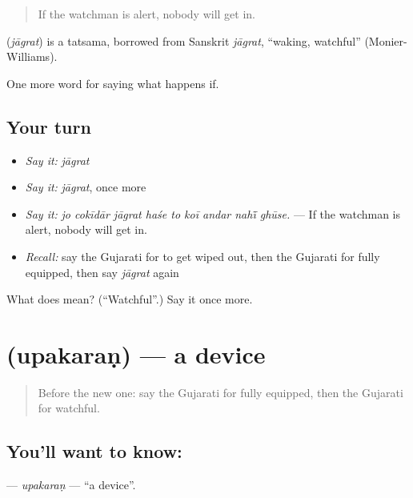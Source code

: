 \begin{quote}
If the watchman is alert, nobody will get in.
\end{quote}

\begin{cousinweb}
\textbf{} (\emph{jāgrat}) is a tatsama, borrowed from Sanskrit \emph{jāgrat}, \textquotedblleft{}waking, watchful\textquotedblright{} (Monier-Williams).
\end{cousinweb}

\begin{grammarlens}[title={What you've built}]
One more word for saying what happens if.
\end{grammarlens}

\subsection*{Your turn}
\begin{itemize}
\raggedright
  \item \emph{Say it:} \emph{jāgrat}
  \item \emph{Say it:} \emph{jāgrat}, once more
  \item \emph{Say it:} \emph{jo cokīdār jāgrat haśe to koī andar nahī̃ ghūse.} — If the watchman is alert, nobody will get in.
  \item \emph{Recall:} say the Gujarati for to get wiped out, then the Gujarati for fully equipped, then say \emph{jāgrat} again
\end{itemize}

\begin{tcolorbox}[breakable,colback=teal!4,colframe=teal!35!black,title={Before you move on}]
What does  mean? (\textquotedblleft{}Watchful\textquotedblright{}.) Say it once more.
\end{tcolorbox}
\section[\texorpdfstring{\gu{ઉપકરણ} (upakaraṇ)}{ઉપકરણ (upakaraṇ)}]{ (upakaraṇ) — a device}

\label{lesson:GU-C392-upakaran}



\begin{quote}
Before the new one: say the Gujarati for fully equipped, then the Gujarati for watchful.
\end{quote}

\subsection*{You'll want to know: }
\textbf{} — \emph{upakaraṇ} — \textquotedblleft{}a device\textquotedblright{}.

